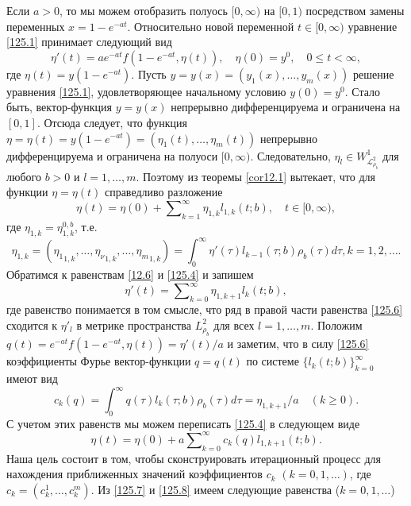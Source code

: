 Если $a>0$, то мы можем отобразить  полуось $[0,\infty)$ на $[0,1)$ посредством  замены переменных $x=1-e^{-at}$. Относительно новой переменной $t\in [0,\infty)$ уравнение \eqref{125.1} принимает следующий вид
\begin{equation}\label{125.3}
\eta'(t)=ae^{-at}f(1-e^{-at},\eta(t)), \quad \eta(0)=y^0,\quad 0\le t<  \infty,
\end{equation}
где $\eta(t)=y(1-e^{-at})$. Пусть $y=y(x)=(y_1(x), \ldots, y_m(x))$ решение уравнения \eqref{125.1}, удовлетворяющее начальному условию $y(0)=y^0$. Стало быть, вектор-функция $y=y(x)$ непрерывно дифференцируема и ограничена на $[0,1]$. Отсюда следует, что функция $\eta=\eta(t)=y(1-e^{-at})=(\eta_1(t),\ldots,\eta_m(t))$ непрерывно дифференцируема и ограничена на полуоси $[0,\infty)$.
Следовательно, $\eta_l\in W^1_{\mathcal{L}_{\rho_b}^2}$ для любого $b>0$ и $l=1,\ldots,m$. Поэтому из теоремы \ref{cor12.1} вытекает, что для функции $\eta=\eta(t)$ справедливо разложение
\begin{equation}\label{125.4}
\eta(t)= \eta(0)+ \sum\nolimits_{k=1}^\infty {\eta}_{1,k} {l}_{1,k}(t;b),\quad t\in[0,\infty),
\end{equation}
где ${\eta}_{1,k}={\eta}_{1,k}^{0,b}$, т.е.
\begin{equation}\label{125.5}
{\eta}_{1,k}=({\eta_1}_{1,k},\ldots, {\eta_\nu}_{1,k},\ldots,{\eta_m}_{1,k})=\int_{0}^\infty \eta'(\tau){l}_{k-1}(\tau;b)\rho_b(\tau)d\tau, k=1,2,\ldots.
\end{equation}
Обратимся к равенствам \eqref{12.6} и  \eqref{125.4} и запишем
\begin{equation}\label{125.6}
\eta'(t)=  \sum\nolimits_{k=0}^\infty {\eta}_{1,k+1}l_{k}(t;b),
\end{equation}
где равенство понимается в том смысле, что ряд в правой части равенства \eqref{125.6} сходится к $\eta'_l$ в метрике пространства $L^2_{\rho_b}$ для всех $l=1,\ldots,m$. Положим $q(t)=e^{-at}f(1-e^{-at},\eta(t))=\eta'(t)/a$ и заметим, что в силу  \eqref{125.6}  коэффициенты Фурье вектор-функции $q=q(t)$ по системе  $\{l_{k}(t;b)\}_{k=0}^\infty$ имеют вид
\begin{equation}\label{125.7}
c_k(q)=\int_{0}^\infty q(\tau)l_{k}(\tau;b)\rho_b(\tau)d\tau=\eta_{1,k+1}/a \quad (k\ge0).
\end{equation}
С учетом этих равенств мы можем переписать \eqref{125.4} в следующем виде
\begin{equation}\label{125.8}
\eta(t)= \eta(0)+ a\sum\nolimits_{k=0}^\infty c_k(q)l_{1,k+1}(t;b).
\end{equation}
Наша цель состоит в том, чтобы сконструировать итерационный процесс для нахождения приближенных значений коэффициентов $c_k$ $(k=0,1,\ldots)$, где $c_k=(c_k^1,\ldots,c_k^m)$.
Из  \eqref{125.7} и \eqref{125.8} имеем следующие равенства ($k=0,1,\ldots$)

